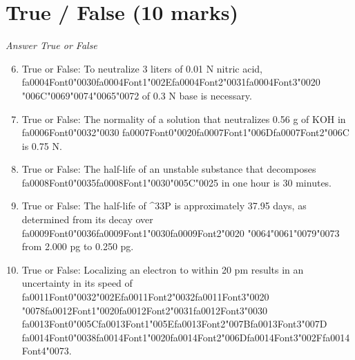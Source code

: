 \documentclass[12pt]{article}
\begin{document}
\section*{True / False (10 marks)}
\textit{Answer True or False}
\begin{enumerate}[label=\arabic*.]
\setcounter{enumi}{5}
\item True or False: To neutralize 3 liters of 0.01 N nitric acid, {\csname fa0004Font0\endcsname\char"0030}{\csname fa0004Font1\endcsname\char"002E}{\csname fa0004Font2\endcsname\char"0031}{\csname fa0004Font3\endcsname\char"0020} {\char"006C}{\char"0069}{\char"0074}{\char"0065}{\char"0072} of 0.3 N base is necessary.
\item True or False: The normality of a solution that neutralizes 0.56 g of KOH in {\csname fa0006Font0\endcsname\char"0032}{\char"0030} {\csname fa0007Font0\endcsname\char"0020}{\csname fa0007Font1\endcsname\char"006D}{\csname fa0007Font2\endcsname\char"006C} is 0.75 N.
\item True or False: The half-life of an unstable substance that decomposes {\csname fa0008Font0\endcsname\char"0035}{\csname fa0008Font1\endcsname\char"0030}{\char"005C}{\char"0025} in one hour is 30 minutes.
\item True or False: The half-life of \^{}33P is approximately 37.95 days, as determined from its decay over {\csname fa0009Font0\endcsname\char"0036}{\csname fa0009Font1\endcsname\char"0030}{\csname fa0009Font2\endcsname\char"0020} {\char"0064}{\char"0061}{\char"0079}{\char"0073} from 2.000 pg to 0.250 pg.
\item True or False: Localizing an electron to within 20 pm results in an uncertainty in its speed of {\csname fa0011Font0\endcsname\char"0032}{\char"002E}{\csname fa0011Font2\endcsname\char"0032}{\csname fa0011Font3\endcsname\char"0020} {\char"0078}{\csname fa0012Font1\endcsname\char"0020}{\csname fa0012Font2\endcsname\char"0031}{\csname fa0012Font3\endcsname\char"0030} {\csname fa0013Font0\endcsname\char"005C}{\csname fa0013Font1\endcsname\char"005E}{\csname fa0013Font2\endcsname\char"007B}{\csname fa0013Font3\endcsname\char"007D} {\csname fa0014Font0\endcsname\char"0038}{\csname fa0014Font1\endcsname\char"0020}{\csname fa0014Font2\endcsname\char"006D}{\csname fa0014Font3\endcsname\char"002F}{\csname fa0014Font4\endcsname\char"0073}.
\end{enumerate}
\end{document}
